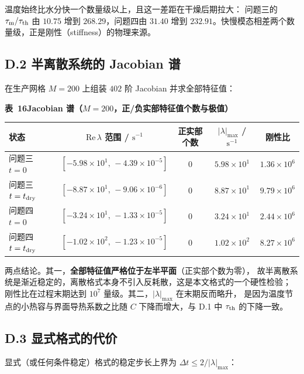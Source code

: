 \documentclass[withoutpreface,bwprint]{cumcmthesis} %
\begin{document}
\begin{appendices}
\noindent 温度始终比水分快一个数量级以上，且这一差距在干燥后期拉大：
问题三的 $\tau_{\rm m}/\tau_{\rm th}$ 由 $10.75$ 增到 $268.29$，问题四由 $31.40$
增到 $232.91$。快慢模态相差两个数量级，正是刚性（stiffness）的物理来源。

\subsection*{D.2 半离散系统的 Jacobian 谱}

在生产网格 $M=200$ 上组装 $402$ 阶 Jacobian 并求全部特征值：

\begin{table}[htbp]
\centering
\begin{minipage}{0.94\textwidth}
\centering\small
\textbf{表~16\quad Jacobian 谱（$M=200$，正/负实部特征值个数与极值）}\\[3pt]
\begin{tabular}{lcccc}
\toprule
状态 & $\mathrm{Re}\,\lambda$ 范围 / $\mathrm{s^{-1}}$
 & 正实部个数 & $|\lambda|_{\max}$ / $\mathrm{s^{-1}}$
 & 刚性比 \\
\midrule
问题三 $t=0$ & $[-5.98\times10^{1},\,-4.39\times10^{-5}]$ & $0$ & $5.98\times10^{1}$ & $1.36\times10^{6}$ \\
问题三 $t=t_{\rm dry}$ & $[-8.87\times10^{1},\,-9.06\times10^{-6}]$ & $0$ & $8.87\times10^{1}$ & $9.79\times10^{6}$ \\
问题四 $t=0$ & $[-3.24\times10^{1},\,-1.33\times10^{-5}]$ & $0$ & $3.24\times10^{1}$ & $2.44\times10^{6}$ \\
问题四 $t=t_{\rm dry}$ & $[-1.02\times10^{2},\,-1.23\times10^{-5}]$ & $0$ & $1.02\times10^{2}$ & $8.27\times10^{6}$ \\
\bottomrule
\end{tabular}
\end{minipage}
\end{table}

\noindent 两点结论。其一，\textbf{全部特征值严格位于左半平面}（正实部个数为零），
故半离散系统是渐近稳定的，离散格式本身不引入反耗散，这是本文格式的一个硬性检验；
刚性比在过程末期达到 $10^7$ 量级。其二，$|\lambda|_{\max}$ 在末期反而略升，
是因为温度节点的小热容与界面导热系数之比随 $C$ 下降而增大，与 D.1 中
$\tau_{\rm th}$ 的下降一致。

\subsection*{D.3 显式格式的代价}

显式（或任何条件稳定）格式的稳定步长上界为 $\Delta t\le2/|\lambda|_{\max}$：


\end{appendices}
\end{document}
